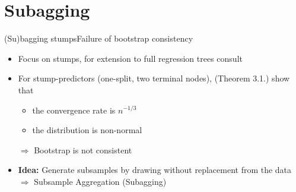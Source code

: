 \documentclass{beamer}
\begin{document}
\section{Subagging}
\begin{frame}{(Su)bagging stumps}{Failure of bootstrap consistency}
\begin{itemize}
\item Focus on stumps, for extension to full regression trees consult \cite{Buhlmann2002}
\item For stump-predictors (one-split, two terminal nodes), \cite{Buhlmann2002} (Theorem 3.1.) show that
\begin{itemize}
	\item{the convergence rate is $n^{-1/3}$}
    \item{the distribution is non-normal}
\end{itemize}
$\Rightarrow$ Bootstrap is not consistent\\

\item \textbf{Idea:} Generate subsamples by drawing without replacement from the data\\
$\Rightarrow$ Subsample Aggregation (Subagging)\
\end{itemize}

\end{frame}




\end{document}
